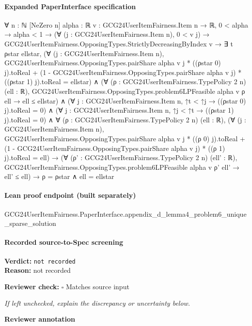\documentclass[10pt]{article}
\newcommand{\reviewerbox}{%
  \par\noindent\fbox{\parbox{0.96\linewidth}{\rule{0pt}{0.38in}}}\par
}
\newcommand{\reviewmatch}[1]{%
  \par\noindent\textbf{Reviewer check:} $\square$\; #1\par
  \noindent\emph{If left unchecked, explain the discrepancy or uncertainty below.}\par
}
\begin{document}
\paragraph{Expanded PaperInterface specification}
\begin{ReviewVerbatim}
∀ {n : ℕ} [NeZero n] {alpha : ℝ} {v : GCG24UserItemFairness.Item n → ℝ},
  0 < alpha →
    alpha < 1 →
      (∀ (j : GCG24UserItemFairness.Item n), 0 < v j) →
        GCG24UserItemFairness.OpposingTypes.StrictlyDecreasingByIndex v →
          ∃ t ρstar ellstar,
            (∀ (j : GCG24UserItemFairness.Item n),
                GCG24UserItemFairness.OpposingTypes.pairShare alpha v j * ((ρstar 0) j).toReal +
                    (1 - GCG24UserItemFairness.OpposingTypes.pairShare alpha v j) * ((ρstar 1) j).toReal =
                  ellstar) ∧
              (∀ (ρ : GCG24UserItemFairness.TypePolicy 2 n) (ell : ℝ),
                  GCG24UserItemFairness.OpposingTypes.problem6LPFeasible alpha v ρ ell → ell ≤ ellstar) ∧
                (∀ {j : GCG24UserItemFairness.Item n}, ↑t < ↑j → ((ρstar 0) j).toReal = 0) ∧
                  (∀ {j : GCG24UserItemFairness.Item n}, ↑j < ↑t → ((ρstar 1) j).toReal = 0) ∧
                    ∀ (ρ : GCG24UserItemFairness.TypePolicy 2 n) (ell : ℝ),
                      (∀ (j : GCG24UserItemFairness.Item n),
                          GCG24UserItemFairness.OpposingTypes.pairShare alpha v j * ((ρ 0) j).toReal +
                              (1 - GCG24UserItemFairness.OpposingTypes.pairShare alpha v j) * ((ρ 1) j).toReal =
                            ell) →
                        (∀ (ρ' : GCG24UserItemFairness.TypePolicy 2 n) (ell' : ℝ),
                            GCG24UserItemFairness.OpposingTypes.problem6LPFeasible alpha v ρ' ell' → ell' ≤ ell) →
                          ρ = ρstar ∧ ell = ellstar
\end{ReviewVerbatim}

\paragraph{Lean proof endpoint (built separately)}\begin{ReviewVerbatim}
GCG24UserItemFairness.PaperInterface.appendix_d_lemma4_problem6_unique_sparse_solution
\end{ReviewVerbatim}

\paragraph{Recorded source-to-Spec screening}
\textbf{Verdict:} \texttt{not recorded}
\\
\textbf{Reason:} not recorded
\reviewmatch{Matches source input}
\noindent\textbf{Reviewer annotation}\par
\reviewerbox
\clearpage
\hypertarget{source-claim-725d3169ac365914}{}
\end{document}
